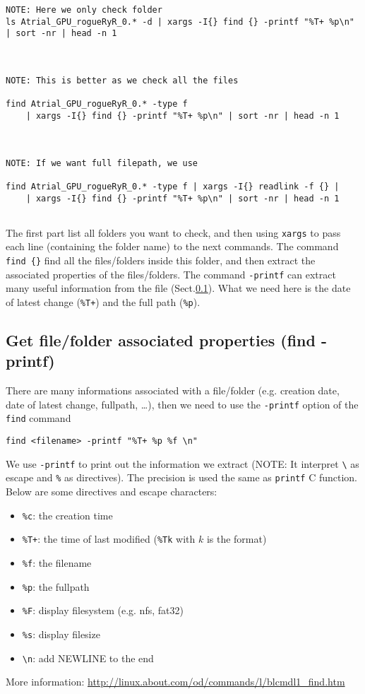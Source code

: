 \begin{verbatim}
NOTE: Here we only check folder 
ls Atrial_GPU_rogueRyR_0.* -d | xargs -I{} find {} -printf "%T+ %p\n" | sort -nr | head -n 1



NOTE: This is better as we check all the files

find Atrial_GPU_rogueRyR_0.* -type f 
    | xargs -I{} find {} -printf "%T+ %p\n" | sort -nr | head -n 1
    
    
    
NOTE: If we want full filepath, we use

find Atrial_GPU_rogueRyR_0.* -type f | xargs -I{} readlink -f {} |
    | xargs -I{} find {} -printf "%T+ %p\n" | sort -nr | head -n 1
          
\end{verbatim}
The first part list all folders you want to check, and then using 
\verb!xargs! to pass each line (containing the folder name) to the next
commands. The command \verb!find {}! find all the files/folders inside this
folder, and then extract the associated properties of the files/folders. 
The command \verb!-printf! can extract many useful information from
the file (Sect.\ref{sec:extract_information_printf}). What we need here is the
date of latest change (\verb!%T+!) and the full path (\verb!%p!).

\subsection{Get file/folder associated properties (find -printf)}
\label{sec:extract_information_printf}


There are many informations associated with a file/folder (e.g. creation date,
date of latest change, fullpath, \ldots), then we need to use the \verb!-printf!
option of the \verb!find! command

\begin{verbatim}
find <filename> -printf "%T+ %p %f \n"
\end{verbatim}
We use \verb!-printf! to print out the information we extract (NOTE: It
interpret \verb!\! as escape and \verb!%! as directives). The precision is used
the same  as \verb!printf! C function.
Below are some
directives and escape characters:

\begin{itemize}
  \item \verb!%c!: the creation time
  \item \verb!%T+!: the time of last modified (\verb!%Tk! with $k$ is the
   format)
  \item \verb!%f!: the filename
  \item \verb!%p!: the fullpath
  \item \verb!%F!: display filesystem (e.g. nfs, fat32)
  \item \verb!%s!: display filesize
  \item \verb!\n!: add NEWLINE to the end
\end{itemize}
More information: \url{http://linux.about.com/od/commands/l/blcmdl1_find.htm}


